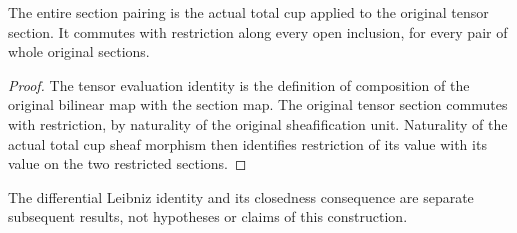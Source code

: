 \begin{theorem}
\label{thm:di-cech-total-cup-section-restriction}
\leanok
{}
The entire section pairing is the actual total cup applied to the
original tensor section. It commutes with restriction along every
open inclusion, for every pair of whole original sections.
\end{theorem}
\begin{proof}
The tensor evaluation identity is the definition of composition of the
original bilinear map with the section map. The original tensor section
commutes with restriction, by naturality of the original sheafification
unit. Naturality of the actual total cup sheaf morphism then identifies
restriction of its value with its value on the two restricted sections.
\end{proof}

The differential Leibniz identity and its closedness consequence are
separate subsequent results, not hypotheses or claims of this construction.
